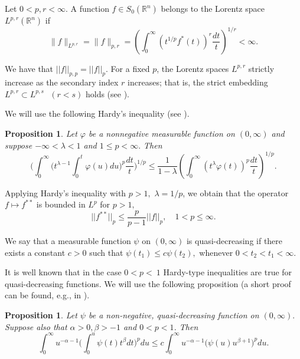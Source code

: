 \documentclass[12pt,twoside,reqno]{amsart}
\numberwithin{equation}{section}
\newtheorem{prop}[teo]{Proposition}
\theoremstyle{definition}
\numberwithin{equation}{section}
\def\a{\alpha}
\def\b{\beta}
\def\f{\varphi}
\begin{document}
Let $0<p,r<\infty.$ A
function $f \in S_0(\mathbb{R}^n)$ belongs to the Lorentz space
$L^{p,r}(\mathbb{R}^n)$ if
\begin{equation*}
\|f\|_{L^{p,r}}=\|f\|_{p,r} = \left( \int_0^\infty \left( t^{1/p} f^*(t)
\right)^r \frac{dt}{t} \right)^{1/r} < \infty.
\end{equation*}



We have that $||f||_{p,p}=||f||_p.$ For a
fixed $p$, the Lorentz spaces $L^{p,r}$ strictly increase as the secondary
index $r$ increases; that is, the strict embedding $L^{p,r}\subset L^{p,s}~~~(r<s)$ holds (see \cite[Ch. 4]{BS}).







\vskip 6pt
We will use the following  Hardy's inequality (see \cite[p. 124]{BS}).

\begin{prop}\label{hardy}
Let $\f$ be a nonnegative
measurable function on $(0,\infty)$ and suppose $-\infty<\lambda<1$ and $1\le p<\infty.$ Then
$$
\biggl(\int_0^{\infty}\Big(t^{\lambda-1}\int_0^t\f(u)du\Big)^p\frac{dt}{t}\biggr)
^{1/p}
\le \frac{1}{1-\lambda}\left(\int_0^\infty\left(t^{\lambda}\f(t)\right)^p\frac{dt}{t}
\right)^{1/p}.
$$
\end{prop}

Applying Hardy's inequality with $p>1,$ $\lambda=1/p$, we obtain that the  operator $f\mapsto f^{**}$  is bounded in $L^p$ for $p>1,$
\begin{equation} \label{bound}
||f^{**}||_p\le \frac{p}{p-1}||f||_p,\quad 1<p\le \infty.
\end{equation}





We say that a measurable function $\psi$ on $(0,\infty)$ is
quasi-decreasing if there exists a constant $c>0$ such that $\psi(t_1)\le c\psi(t_2),$
whenever $0<t_2<t_1<\infty$.

It is well known that in the case $0<p<~1$ Hardy-type inequalities are true for quasi-decreasing
functions. We will use the following proposition
(a short proof can be found, e.g., in \cite{KL}).

\begin{prop}\label{hardy-type}
Let $\psi$ be a non-negative, quasi-decreasing function on
$(0,\infty).$  Suppose also that $\a>0, \b>-1$
and $0<p<1$. Then
$$
\int_0^{\infty}{u}^{-\a-1}\Big(\int_0^{u}\psi(t)t^{\b}dt\Big)^pdu
\le c\int_0^{\infty}
u^{-\a-1}\big(\psi(u)u^{\b+1}\big)^pdu.
$$
\end{prop}
\end{document}
